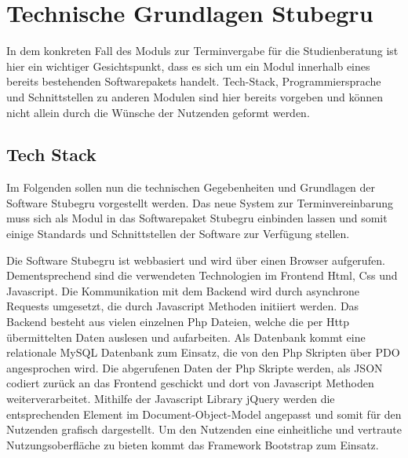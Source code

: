 \section{Technische Grundlagen Stubegru}
In dem konkreten Fall des Moduls zur Terminvergabe für die Studienberatung ist
hier ein wichtiger Gesichtspunkt, dass es sich um ein Modul innerhalb eines
bereits bestehenden Softwarepakets handelt. \gls{Tech-Stack},
Programmiersprache und Schnittstellen zu anderen Modulen sind hier bereits
vorgeben und können nicht allein durch die Wünsche der Nutzenden geformt
werden.

\subsection*{Tech Stack}
Im Folgenden sollen nun die technischen Gegebenheiten und Grundlagen der
Software Stubegru vorgestellt werden. Das neue System zur Terminvereinbarung
muss sich als Modul in das Softwarepaket Stubegru einbinden lassen und somit
einige Standards und Schnittstellen der Software zur Verfügung stellen.

Die Software Stubegru ist webbasiert und wird über einen Browser aufgerufen.
Dementsprechend sind die verwendeten Technologien im Frontend \gls{Html},
\gls{Css} und \gls{Javascript}. Die Kommunikation mit dem Backend wird durch
asynchrone Requests umgesetzt, die durch Javascript Methoden initiiert werden.
Das Backend besteht aus vielen einzelnen \gls{Php} Dateien, welche die per
\gls{Http} übermittelten Daten auslesen und aufarbeiten. Als Datenbank kommt
eine relationale \gls{MySQL} Datenbank zum Einsatz, die von den Php Skripten
über \gls{PDO} angesprochen wird. Die abgerufenen Daten der Php Skripte werden,
als \gls{JSON} codiert zurück an das Frontend geschickt und dort von Javascript
Methoden weiterverarbeitet. Mithilfe der Javascript Library \gls{jQuery} werden
die entsprechenden Element im \gls{Document-Object-Model} angepasst und somit
für den Nutzenden grafisch dargestellt. Um den Nutzenden eine einheitliche und
vertraute Nutzungsoberfläche zu bieten kommt das Framework \gls{Bootstrap} zum
Einsatz.

